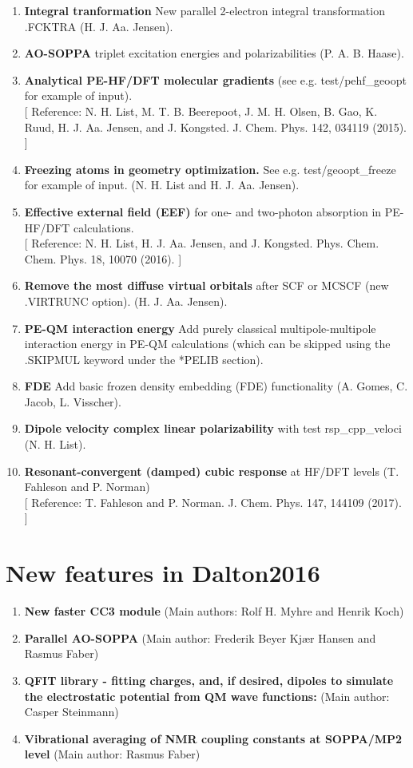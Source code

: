 \begin{enumerate}

\item{\bf Integral tranformation} New parallel 2-electron integral transformation .FCKTRA  (H. J. Aa. Jensen).
\item{\bf AO-SOPPA} triplet excitation energies and polarizabilities (P. A. B. Haase).
\item{\bf Analytical PE-HF/DFT molecular gradients} (see e.g. test/pehf\_geoopt for example of input). \\ {}
  [ Reference: N. H. List, M. T. B. Beerepoot, J. M. H. Olsen, B. Gao, K. Ruud, H. J. Aa. Jensen, and J. Kongsted. J. Chem. Phys. 142, 034119 (2015). ]
\item{\bf Freezing atoms in geometry optimization.}
  See e.g. test/geoopt\_freeze for example of input.  (N. H. List and H. J. Aa. Jensen).
\item{\bf Effective external field (EEF)} for one- and two-photon absorption in PE-HF/DFT calculations.\\ {}
  [ Reference: N. H. List, H. J. Aa. Jensen, and J. Kongsted. Phys. Chem. Chem. Phys. 18, 10070 (2016). ]
\item{\bf Remove the most diffuse virtual orbitals} after SCF or MCSCF (new .VIRTRUNC option). (H. J. Aa. Jensen).
\item{\bf PE-QM interaction energy} Add purely classical multipole-multipole interaction energy in PE-QM calculations (which can be skipped using the .SKIPMUL keyword under the *PELIB section).
\item{\bf FDE} Add basic frozen density embedding (FDE) functionality (A. Gomes, C. Jacob, L. Visscher).
\item{\bf Dipole velocity complex linear polarizability} with test rsp\_cpp\_veloci (N. H. List).
\item{\bf Resonant-convergent (damped) cubic response} at HF/DFT levels (T. Fahleson and P. Norman)\\ {}
  [ Reference: T. Fahleson and P. Norman. J. Chem. Phys. 147, 144109 (2017). ]
 
 \end{enumerate}

\section{New features in Dalton2016}

\begin{enumerate}
\item{\bf New faster CC3 module}
(Main authors: Rolf H. Myhre and Henrik Koch)
\item{\bf Parallel AO-SOPPA}
(Main author: Frederik Beyer Kjær Hansen and Rasmus Faber)
\item{\bf QFIT library - fitting charges, and, if desired, dipoles to simulate the electrostatic potential from QM wave functions:}
(Main author: Casper Steinmann)
\item{\bf Vibrational averaging of NMR coupling constants at SOPPA/MP2 level} 
(Main author: Rasmus Faber)
\end{enumerate}

